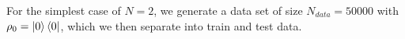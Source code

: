 For the simplest case of $N = 2$, we generate a data set of size $N_{data} = 50000$ with $\rho_0 = \ket{0}\bra{0}$, which we then separate into train and test data.
